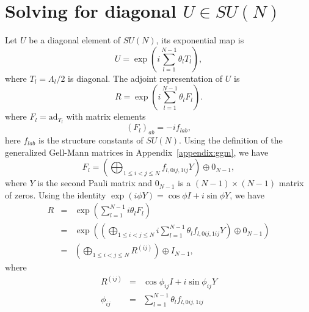 \documentclass{article}
\begin{document}
\section{Solving for diagonal \texorpdfstring{$U\in SU(N)$}{U in SU.N}}
\label{appendix:diag_U}
Let $U$ be a diagonal element of $SU(N)$, its exponential map is
\begin{equation}
  \label{eq:U_exp_map}
  U = \exp\left(i\sum_{l=1}^{N-1}\theta_lT_l\right),
\end{equation}
where $T_l = \Lambda_l/2$ is diagonal. The adjoint representation of $U$
is
\begin{equation}
  \label{eq:R_exp_map}
  R = \exp\left(i\sum_{l=1}^{N-1}\theta_lF_l\right).
\end{equation}
where $F_l = \text{ad}_{T_l}$ with matrix elements
\begin{equation}
  \left(F_l\right)_{ab} = -if_{lab},
\end{equation}
here $f_{lab}$ is the structure constants of $SU(N)$.  Using the definition
of the generalized Gell-Mann matrices in Appendix~\ref{appendix:ggm}, we
have
\begin{equation}
  F_l = \left(\bigoplus_{1\le i < j\le N}f_{l,0ij,1ij}Y\right)\oplus0_{N-1},
\end{equation}
where $Y$ is the second Pauli matrix and $0_{N-1}$ is a $(N-1)\times(N-1)$
matrix of zeros.  Using the identity
$\exp(i\phi Y) = \cos\phi I+i\sin\phi Y$, we have
\begin{eqnarray}
  R & = & \exp\left(\sum_{l=1}^{N-1}i\theta_lF_l\right) \\
  & = & \exp\left(\left(\bigoplus_{1\le i<j\le N}
  i\sum_{l=1}^{N-1}\theta_lf_{l,0ij,1ij}Y\right)\oplus0_{N-1}\right) \\
  & = & \left(\bigoplus_{1\le i<j\le N}R^{(ij)}\right)\oplus I_{N-1},
\end{eqnarray}
where
\begin{eqnarray}
  R^{(ij)} & = & \cos\phi_{ij}I
  + i\sin\phi_{ij} Y \\
  \label{eq:phi_ij}
  \phi_{ij} & = & \sum_{l=1}^{N-1}\theta_lf_{l,0ij,1ij}
\end{eqnarray}
\end{document}
